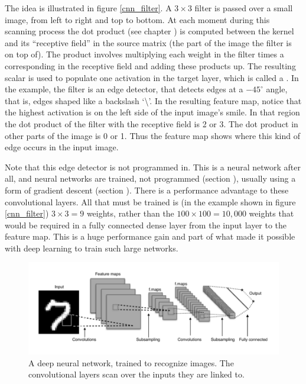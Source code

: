 The idea is illustrated in figure \ref{cnn_filter}. A $3 \times 3$ filter is passed over a small image, from left to right and top to bottom. At each moment during this scanning process the dot product (see chapter ) is computed between the kernel and its ``receptive field'' in the source matrix (the part of the image the filter is on top of). The product involves multiplying each weight in the filter times a corresponding in the receptive field and adding these products up. The resulting scalar is used to populate one activation in the target layer, which is called a . In the example, the filter is an edge detector, that detects edges at a $-45^\circ$ angle, that is, edges shaped like a backslash `\textbackslash'. In the resulting feature map, notice that the highest activation is on the left side of the input image's smile. In that region the dot product of the filter with the receptive field is 2 or 3. The dot product in other parts of the image is 0 or 1. Thus the feature map shows where this kind of edge occurs in the input image.

Note that this edge detector is not programmed in. This is a neural network after all, and neural networks are trained, not programmed (section ), usually using a form of gradient descent (section ). There is a performance advantage to these convolutional layers. All that must be trained is (in the example shown in figure \ref{cnn_filter}) $3 \times 3=9$ weights, rather than the $100 \times 100 = 10,000$ weights that would be required in a fully connected dense layer from the input layer to the feature map. This is a huge performance gain and part of what  made it possible with deep learning to train such large networks.




\begin{figure}[h]
\centering
\includegraphics[scale=.45]{./images/deepNet.png}
\caption[Adapted from a creative commons image by Aphex34 at \url{https://commons.wikimedia.org/wiki/File:Typical_cnn.png} ]{A deep neural network, trained to recognize images. The convolutional layers scan over the inputs they are linked to. }
\label{deep_net2}
\end{figure}

